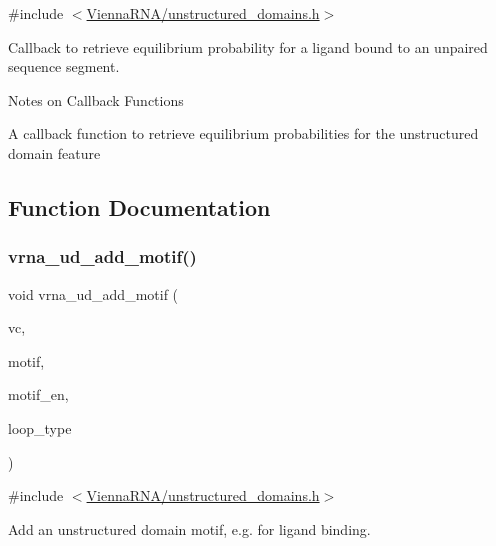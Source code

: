 {\ttfamily \#include $<$\mbox{\hyperlink{unstructured__domains_8h}{Vienna\+R\+N\+A/unstructured\+\_\+domains.\+h}}$>$}



Callback to retrieve equilibrium probability for a ligand bound to an unpaired sequence segment. 

\begin{DoxyRefDesc}{Notes on Callback Functions}
\item[\mbox{\hyperlink{callbacks__callbacks000015}{Notes on Callback Functions}}]A callback function to retrieve equilibrium probabilities for the unstructured domain feature \end{DoxyRefDesc}


\subsection{Function Documentation}
\mbox{\label{group__domains__up_gaec0c3313fb2951946614f920d289829a}} 
\subsubsection{\texorpdfstring{vrna\+\_\+ud\+\_\+add\+\_\+motif()}{vrna\_ud\_add\_motif()}}
{\footnotesize\ttfamily void vrna\+\_\+ud\+\_\+add\+\_\+motif (\begin{DoxyParamCaption}\item[{\mbox{\hyperlink{group__fold__compound_ga1b0cef17fd40466cef5968eaeeff6166}{vrna\+\_\+fold\+\_\+compound\+\_\+t}} $\ast$}]{vc,  }\item[{const char $\ast$}]{motif,  }\item[{double}]{motif\+\_\+en,  }\item[{unsigned int}]{loop\+\_\+type }\end{DoxyParamCaption})}



{\ttfamily \#include $<$\mbox{\hyperlink{unstructured__domains_8h}{Vienna\+R\+N\+A/unstructured\+\_\+domains.\+h}}$>$}



Add an unstructured domain motif, e.\+g. for ligand binding. 

